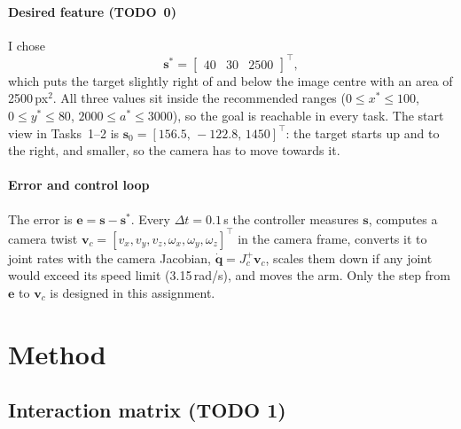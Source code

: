 \documentclass[11pt,a4paper]{article}
\newcommand{\vect}[1]{\bm{#1}}
\newcommand{\pinv}{^{+}}
\begin{document}
\paragraph{Desired feature (TODO~0)} I chose
\begin{equation}
  \vect{s}^{*}=\begin{bmatrix}40 & 30 & 2500\end{bmatrix}^{\!\top},
\end{equation}
which puts the target slightly right of and below the image centre with an area of 2500\,px$^{2}$.
All three values sit inside the recommended ranges ($0\le x^{*}\le100$, $0\le y^{*}\le80$,
$2000\le a^{*}\le3000$), so the goal is reachable in every task. The start view in Tasks~1--2 is
$\vect{s}_0=[156.5,\,-122.8,\,1450]^{\top}$: the target starts up and to the right, and smaller,
so the camera has to move towards it.

\paragraph{Error and control loop} The error is $\vect{e}=\vect{s}-\vect{s}^{*}$. Every
$\Delta t=0.1$\,s the controller measures $\vect{s}$, computes a camera twist
$\vect{v}_c=[v_x,v_y,v_z,\omega_x,\omega_y,\omega_z]^{\top}$ in the camera frame, converts it to joint
rates with the camera Jacobian, $\dot{\vect q}=J_c\pinv\vect{v}_c$, scales them down if any joint would
exceed its speed limit (3.15\,rad/s), and moves the arm. Only the step from $\vect{e}$ to $\vect{v}_c$
is designed in this assignment.

\section{Method}\label{sec:method}

\subsection{Interaction matrix (TODO 1)}
\end{document}
